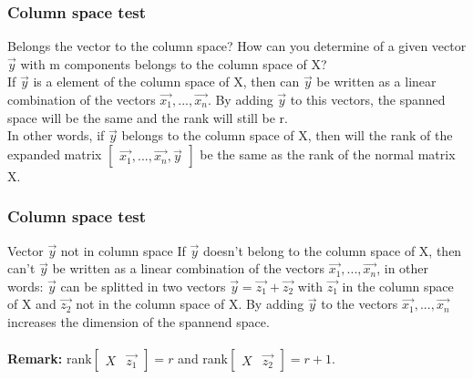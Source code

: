\begin{frame}
	\frametitle{Column space test}
	\begin{block}{Belongs the vector to the column space?}
		How can you determine of a given vector $\overrightarrow{y}$ with m components belongs to the column space of X?\\
		 If $\overrightarrow{y}$ is a element of the column space of X, then can $\overrightarrow{y}$ be written as a linear combination of the vectors $\overrightarrow{x_1},...,\overrightarrow{x_n}$. By adding $\overrightarrow{y}$ to this vectors, the spanned space will be the same and the rank will still be r. \\
		In other words, if $\overrightarrow{y}$ belongs to the column space of X, then will the rank of the expanded matrix $\begin{bmatrix} \overrightarrow{x_1},...,\overrightarrow{x_n},\overrightarrow{y}\end{bmatrix}$
		be the same as the rank of the normal matrix X.\\
		\vspace{4mm}
	\end{block}
\end{frame}

\begin{frame}
	\frametitle{Column space test}
	\begin{block}{Vector $\overrightarrow{y}$ not in column space}
		If $\overrightarrow{y}$ doesn't belong to the column space of X, then can't $\overrightarrow{y}$ be written as a linear combination of the vectors $\overrightarrow{x_1},...,\overrightarrow{x_n}$, in other words: $\overrightarrow{y}$ can be splitted in two vectors $\overrightarrow{y}=\overrightarrow{z_1}+\overrightarrow{z_2}$ with $\overrightarrow{z_1}$ in the column space of X and $\overrightarrow{z_2}$ not in the column space of X. By adding $\overrightarrow{y}$ to the vectors $\overrightarrow{x_1},...,\overrightarrow{x_n}$ increases the dimension of the spannend space.\\
		\vspace{4mm}
		\\
	\vspace{4mm}
	{\bf Remark:} rank$\begin{bmatrix} X & \overrightarrow{z_1} \end{bmatrix} =r$ and rank$\begin{bmatrix} X & \overrightarrow{z_2} \end{bmatrix} =r+1$.
	\end{block}
\end{frame}

